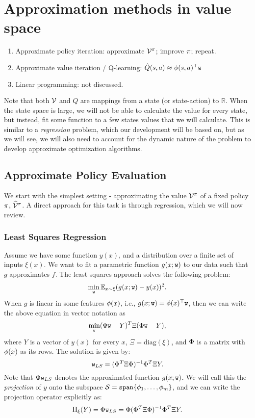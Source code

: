 \section{Approximation methods in value space}
\begin{enumerate}
\item Approximate policy iteration: approximate $\mathcal{V}^\pi$; improve $\pi$; repeat.
\item Approximate value iteration / Q-learning: $\hat{Q}(s,a)\approx {\phi}(s,a)^\top {\texttt{w}}$
\item Linear programming: not discussed.
\end{enumerate}

Note that both $\mathcal{V}$ and $Q$ are mappings from a state (or state-action) to $\mathbb{R}$. When the state space is large, we will not be able to calculate the value for every state, but instead, fit some function to a few states values that we will calculate. This is similar to a \emph{regression} problem, which our development will be based on, but as we will see, we will also need to account for the dynamic nature of the problem to develop approximate optimization algorithms.

\subsection{Approximate Policy Evaluation}

We start with the simplest setting - approximating the value $\mathcal{V}^{\pi}$ of a fixed policy $\pi$, $\widehat{\mathcal{V}}^{\pi}$. A direct approach for this task is through regression, which we will now review. 

\subsubsection{Least Squares Regression}
Assume we have some function $y(x)$, and a distribution over a finite set of inputs $\xi(x)$. 
We want to fit a parametric function $g(x;\texttt{w})$ to our data such that $g$ approximates $f$. The least squares approach solves the following problem:
$$
\min_{\texttt{w}} \mathbb{E}_{x\sim\xi} (g(x;\texttt{w}) - y(x))^2.
$$
When $g$ is linear in some features $\phi(x)$, i.e., $g(x;\texttt{w}) = \phi(x)^\top\texttt{w} $, then we can write the above equation in vector notation as
$$
\min_{\texttt{w}} (\Phi \texttt{w} - Y)^T \Xi (\Phi \texttt{w} - Y),
$$
where $Y$ is a vector of $y(x)$ for every $x$, $\Xi = \text{diag}(\xi)$, and $\Phi$ is a matrix with $\phi(x)$ as its rows. The solution is given by:
$$
\texttt{w}_{LS} = (\Phi^T \Xi \Phi)^{-1} \Phi^T \Xi Y.
$$
Note that $\Phi \texttt{w}_{LS}$ denotes the approximated function $g(x;\texttt{w})$. We will call this the \emph{projection} of $y$ onto the subspace $\mathcal{S}=\texttt{span}\{\phi_{1},\dots,\phi_{m}\}$, and we can write the projection operator explicitly as:
$$
\Pi_\xi(Y) = \Phi \texttt{w}_{LS} = \Phi (\Phi^T \Xi \Phi)^{-1} \Phi^T \Xi Y.
$$

